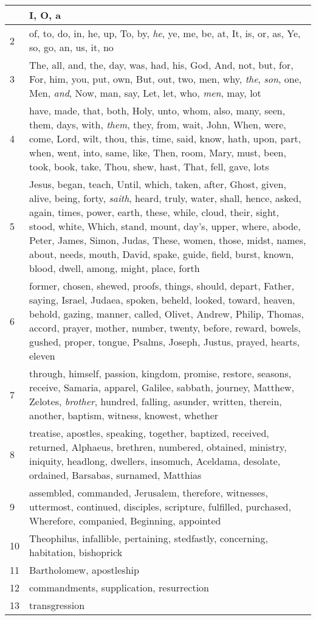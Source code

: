 \begin{longtable}{l|p{3.75in}}
\hline \hline
\endlastfoot
1 & I, O, a \\ \hline
2 & of, to, do, in, he, up, To, by, \emph{he}, ye, me, be, at, It, is, or, as, Ye, so, go, an, us, it, no \\ \hline
3 & The, all, and, the, day, was, had, his, God, And, not, but, for, For, him, you, put, own, But, out, two, men, why, \emph{the}, \emph{son}, one, Men, \emph{and}, Now, man, say, Let, let, who, \emph{men}, may, lot \\ \hline
4 & have, made, that, both, Holy, unto, whom, also, many, seen, them, days, with, \emph{them}, they, from, wait, John, When, were, come, Lord, wilt, thou, this, time, said, know, hath, upon, part, when, went, into, same, like, Then, room, Mary, must, been, took, book, take, Thou, shew, hast, That, fell, gave, lots \\ \hline
5 & Jesus, began, teach, Until, which, taken, after, Ghost, given, alive, being, forty, \emph{saith}, heard, truly, water, shall, hence, asked, again, times, power, earth, these, while, cloud, their, sight, stood, white, Which, stand, mount, day's, upper, where, abode, Peter, James, Simon, Judas, These, women, those, midst, names, about, needs, mouth, David, spake, guide, field, burst, known, blood, dwell, among, might, place, forth \\ \hline
6 & former, chosen, shewed, proofs, things, should, depart, Father, saying, Israel, Judaea, spoken, beheld, looked, toward, heaven, behold, gazing, manner, called, Olivet, Andrew, Philip, Thomas, accord, prayer, mother, number, twenty, before, reward, bowels, gushed, proper, tongue, Psalms, Joseph, Justus, prayed, hearts, eleven \\ \hline
7 & through, himself, passion, kingdom, promise, restore, seasons, receive, Samaria, apparel, Galilee, sabbath, journey, Matthew, Zelotes, \emph{brother}, hundred, falling, asunder, written, therein, another, baptism, witness, knowest, whether \\ \hline
8 & treatise, apostles, speaking, together, baptized, received, returned, Alphaeus, brethren, numbered, obtained, ministry, iniquity, headlong, dwellers, insomuch, Aceldama, desolate, ordained, Barsabas, surnamed, Matthias \\ \hline
9 & assembled, commanded, Jerusalem, therefore, witnesses, uttermost, continued, disciples, scripture, fulfilled, purchased, Wherefore, companied, Beginning, appointed \\ \hline
10 & Theophilus, infallible, pertaining, stedfastly, concerning, habitation, bishoprick \\ \hline
11 & Bartholomew, apostleship \\ \hline
12 & commandments, supplication, resurrection \\ \hline
13 & transgression \\ \hline
\end{longtable}






